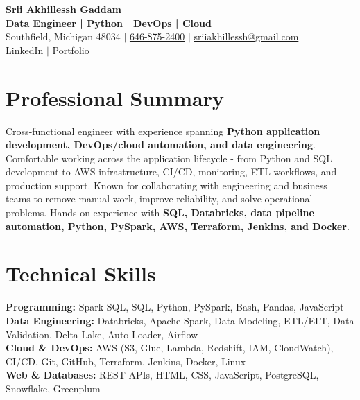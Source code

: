 \documentclass[letterpaper,10pt]{article}
\begin{document}
\fontsize{9.35pt}{10.45pt}\selectfont

\begin{center}
    {\LARGE \textbf{Srii Akhillessh Gaddam}} \\[-1pt]
    \textbf{Data Engineer | Python | DevOps | Cloud} \\[2pt]
    Southfield, Michigan 48034 $|$
    \href{tel:6468752400}{646-875-2400} $|$
    \href{mailto:sriiakhillessh@gmail.com}{sriiakhillessh@gmail.com} \\[1pt]
    \href{https://www.linkedin.com/in/srii-akhiilessh-gaddam-b48668191/}{LinkedIn} $|$
    \href{https://sriiakhillesshg.github.io/portfolio/}{Portfolio}
\end{center}
\vspace{-8pt}

\section{Professional Summary}
\small{Cross-functional engineer with experience spanning \textbf{Python application development, DevOps/cloud automation, and data engineering}. Comfortable working across the application lifecycle - from Python and SQL development to AWS infrastructure, CI/CD, monitoring, ETL workflows, and production support. Known for collaborating with engineering and business teams to remove manual work, improve reliability, and solve operational problems. Hands-on experience with \textbf{SQL, Databricks, data pipeline automation, Python, PySpark, AWS, Terraform, Jenkins, and Docker}.}

\section{Technical Skills}
\small{
\textbf{Programming:} Spark SQL, SQL, Python, PySpark, Bash, Pandas, JavaScript \\
\textbf{Data Engineering:} Databricks, Apache Spark, Data Modeling, ETL/ELT, Data Validation, Delta Lake, Auto Loader, Airflow \\
\textbf{Cloud \& DevOps:} AWS (S3, Glue, Lambda, Redshift, IAM, CloudWatch), CI/CD, Git, GitHub, Terraform, Jenkins, Docker, Linux \\
\textbf{Web \& Databases:} REST APIs, HTML, CSS, JavaScript, PostgreSQL, Snowflake, Greenplum
}

\end{document}

